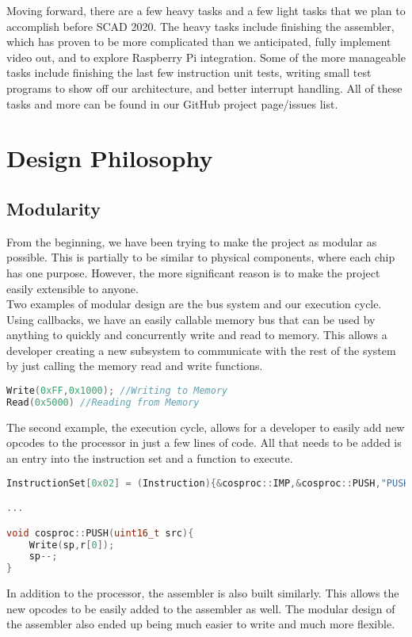 \documentclass[conference]{IEEEtran}
\begin{document}
Moving forward, there are a few heavy tasks and a few light tasks that we plan to accomplish before SCAD 2020. The heavy tasks include finishing the assembler, which has proven to be more complicated than we anticipated, fully implement video out, and to explore Raspberry Pi integration. Some of the more manageable tasks include finishing the last few instruction unit tests, writing small test programs to show off our architecture, and better interrupt handling. All of these tasks and more can be found in our GitHub project page/issues list.

\section{Design Philosophy}
\subsection{Modularity}
From the beginning, we have been trying to make the project as modular as possible. This is partially to be similar to physical components, where each chip has one purpose. However, the more significant reason is to make the project easily extensible to anyone.\\ Two examples of modular design are the bus system and our execution cycle. Using callbacks, we have an easily callable memory bus that can be used by anything to quickly and concurrently write and read to memory. This allows a developer creating a new subsystem to communicate with the rest of the system by just calling the memory read and write functions. 

\begin{lstlisting}[language=C++, caption=Example of the Memory Bus being called]
Write(0xFF,0x1000); //Writing to Memory
Read(0x5000) //Reading from Memory
\end{lstlisting}

The second example, the execution cycle, allows for a developer to easily add new opcodes to the processor in just a few lines of code. All that needs to be added is an entry into the instruction set and a function to execute.
\begin{lstlisting}[language=C++, caption=Example of instruction set entry and function]
InstructionSet[0x02] = (Instruction){&cosproc::IMP,&cosproc::PUSH,"PUSH",1};

...

void cosproc::PUSH(uint16_t src){
	Write(sp,r[0]);
	sp--;
}
\end{lstlisting}
In addition to the processor, the assembler is also built similarly. This allows the new opcodes to be easily added to the assembler as well. The modular design of the assembler also ended up being much easier to write and much more flexible. 
\end{document}
